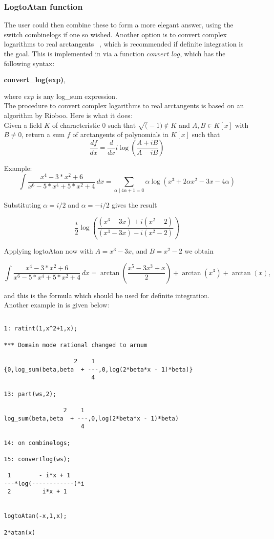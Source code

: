 \subsubsection{LogtoAtan function}
The user could then combine these to form a more elegant answer, using the switch combinelogs if one so wished. Another option is to convert complex logarithms to real arctangents ~\cite{Bronstein:97}, which is recommended if definite integration is the goal. This is implemented in \REDUCE via a function $convert\_log$, which has the following syntax:
\begin{center} \textbf{convert\_log(exp)}, \end{center}
where $exp$ is any log\_sum expression.\\[\baselineskip]
%
The procedure to convert complex logarithms to real arctangents is based on an algorithm by Rioboo. Here is what it does: \\[\baselineskip]
%
Given a field $K$ of characteristic 0 such that $\sqrt(-1) \not\in K$ and 
$A, B \in K[x]$ with $B \not = 0$, return a sum $f$ of arctangents of polynomials in $K[x]$ such that
\[  \frac{df}{dx}=\frac{d}{dx} i \log(\frac{A+ i B}{A- i B}) \]

Example:
\[ \int \frac{x^4-3*x^2+6}{x^6-5*x^4+5*x^2+4} \, dx = \sum_{ \alpha \mid 4\alpha+1=0} \alpha \log(x^3+2\alpha x^2-3 x-4 \alpha) \]

Substituting $\alpha=i/2$ and $\alpha=-i/2$ gives the result

\[ \frac{i}{2} \log(\frac{(x^3-3 x)+i (x^2-2)}{(x^3-3 x)-i (x^2-2)}) \]

Applying logtoAtan now with $A=x^3-3 x$, and $B=x^2-2$ we obtain

\[ \int \frac{x^4-3*x^2+6}{x^6-5*x^4+5*x^2+4} \, dx = \arctan(\frac{x^5-3 x^3+x}{2})+\arctan(x^3)+\arctan(x) , \]

and this is the formula which should be used for definite integration. \\[\baselineskip]
%
Another example in \REDUCE is given below:
\begin{verbatim}

1: ratint(1,x^2+1,x);

*** Domain mode rational changed to arnum

                    2    1
{0,log_sum(beta,beta  + ---,0,log(2*beta*x - 1)*beta)}
                         4

13: part(ws,2);

                 2    1
log_sum(beta,beta  + ---,0,log(2*beta*x - 1)*beta)
                      4

14: on combinelogs;

15: convertlog(ws);

 1        - i*x + 1
---*log(------------)*i 
 2         i*x + 1


logtoAtan(-x,1,x);

2*atan(x) 

\end{verbatim}
